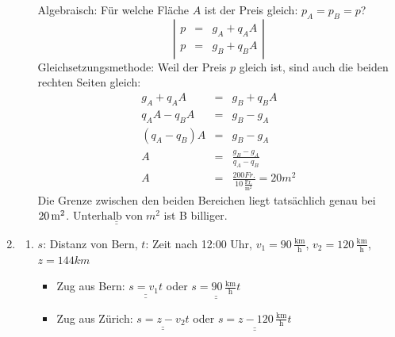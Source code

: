 \documentclass[%
11pt,%
twoside,%
titlepage,%
german,%
]{scrartcl}
\newcommand{\ufrac}[2]{\ensuremath{\,\frac{\mathrm{#1}}{\mathrm{#2}}}}
\newcommand{\result}[1]{\underline{\underline{#1}}}
\begin{document}
\begin{enumerate}
\begin{enumerate}
      Algebraisch: F\"ur welche Fl\"ache $A$ ist der Preis gleich: $p_A=p_B=p$?
    \begin{displaymath}
      \left| 
        \begin{array}{rcl}
          p & = & g_A + q_A A \\
          p & = & g_B + q_B A
        \end{array} \right|
    \end{displaymath}
    Gleichsetzungsmethode: Weil der Preis $p$ gleich ist, sind auch die beiden rechten Seiten gleich:
    \begin{eqnarray*}
      g_A + q_A A & = & g_B + q_B A \\
      q_A A - q_B A & = & g_B - g_A \\
      (q_A-q_B)A & = & g_B-g_A \\
      A & = & \frac{g_B-g_A}{q_A-q_B} \\
      A & = & \frac{200\unit{Fr.}}{10\ufrac{Fr.}{m^2}}=20\unit{m^2}
    \end{eqnarray*}
    Die Grenze zwischen den beiden Bereichen liegt tats\"achlich genau bei $\unit[20]{m^2}$. $\result{\mathrm{Unterhalb\;von}\;\unit{m^2}}$ ist B billiger.
    \end{enumerate}

\item 
  \begin{enumerate}
  \item $s$: Distanz von Bern, $t$: Zeit nach 12:00 Uhr, $v_1=90\ufrac{km}{h}$, $v_2=120\ufrac{km}{h}$, $z=144\unit{km}$
    \begin{itemize}
    \item Zug aus Bern: $\result{s=v_1 t}$ oder $\result{s=90\ufrac{km}{h} t}$
    \item Zug aus Z\"urich: $\result{s=z-v_2 t}$ oder $\result{s=z-120\ufrac{km}{h} t}$
    \end{itemize}
    

\end{enumerate}
\end{enumerate}
\end{document}
